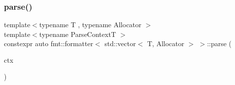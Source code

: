 \mbox{\label{structfmt_1_1formatter_3_01std_1_1vector_3_01_t_00_01_allocator_01_4_01_4_ac8c36547961c3a5d1a4c9ab005bef400}} 
\subsubsection{\texorpdfstring{parse()}{parse()}}
{\footnotesize\ttfamily template$<$typename T , typename Allocator $>$ \\
template$<$typename Parse\+ContextT $>$ \\
constexpr auto fmt\+::formatter$<$ std\+::vector$<$ T, Allocator $>$ $>$\+::parse (\begin{DoxyParamCaption}\item[{Parse\+ContextT \&}]{ctx }\end{DoxyParamCaption})}

